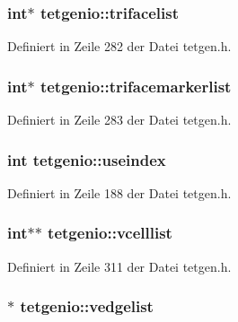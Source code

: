 \hypertarget{classtetgenio_a25e290684bfb26d4d9b5e67059c572e2}{
\subsubsection[{trifacelist}]{\setlength{\rightskip}{0pt plus 5cm}int$\ast$ tetgenio\-::trifacelist}}\label{classtetgenio_a25e290684bfb26d4d9b5e67059c572e2}


Definiert in Zeile 282 der Datei tetgen.\-h.

\hypertarget{classtetgenio_a22a2e0937d0da63a2fda26fc1671b32f}{
\subsubsection[{trifacemarkerlist}]{\setlength{\rightskip}{0pt plus 5cm}int$\ast$ tetgenio\-::trifacemarkerlist}}\label{classtetgenio_a22a2e0937d0da63a2fda26fc1671b32f}


Definiert in Zeile 283 der Datei tetgen.\-h.

\hypertarget{classtetgenio_ae95528b3d4525a3584dd26cadb8035ad}{
\subsubsection[{useindex}]{\setlength{\rightskip}{0pt plus 5cm}int tetgenio\-::useindex}}\label{classtetgenio_ae95528b3d4525a3584dd26cadb8035ad}


Definiert in Zeile 188 der Datei tetgen.\-h.

\hypertarget{classtetgenio_ac39235a7d29d7786e8471e9c3b88d292}{
\subsubsection[{vcelllist}]{\setlength{\rightskip}{0pt plus 5cm}int$\ast$$\ast$ tetgenio\-::vcelllist}}\label{classtetgenio_ac39235a7d29d7786e8471e9c3b88d292}


Definiert in Zeile 311 der Datei tetgen.\-h.

\hypertarget{classtetgenio_ab9abf598dc77ffd6754cc087f32bcc98}{
\subsubsection[{vedgelist}]{$\ast$ tetgenio\-::vedgelist}}\label{classtetgenio_ab9abf598dc77ffd6754cc087f32bcc98}


